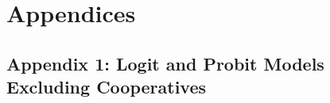 \documentclass[a4paper,nobind]{templates/ociamthesis}
\begin{document}
\hypertarget{refs}{}
\begin{CSLReferences}{0}{0}
\end{CSLReferences}

\newpage

\hypertarget{appendices}{%
\section{Appendices}\label{appendices}}

\hypertarget{appendix-1-logit-and-probit-models-excluding-cooperatives}{%
\subsection{Appendix 1: Logit and Probit Models Excluding Cooperatives}\label{appendix-1-logit-and-probit-models-excluding-cooperatives}}
\end{document}
